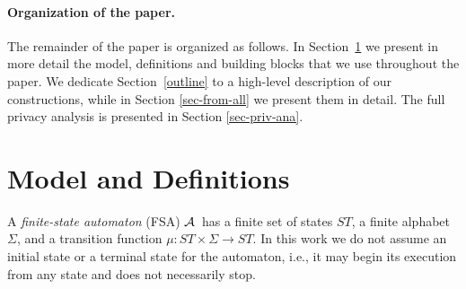 \documentclass[letterpaper,11pt]{article}
\newcommand{\ignore}[1]{}
               {}
\newcommand{\A}{$\cal A$}
\begin{document}
\vspace{-.1in}

\paragraph{Organization of the paper.} The remainder of the paper is
organized as follows. In Section~\ref{sec-Prelim_and_outline} we present
in more detail the model, definitions and building blocks that we use 
throughout the paper. We dedicate Section~\ref{outline} to a high-level
description of our constructions, while in Section \ref{sec-from-all} we 
present them in detail. The full privacy analysis is presented in Section \ref{sec-priv-ana}. 
\ignore{The first scheme $\Pi_1$, in which we need all of the agents to reconstruct the current state of the computation is described in section~\ref{sec-from-all-details}. In section \ref{sec-from-t} we present two schemes $\Pi_2$ and $\Pi_3$, in which we need only a subset of the agents to reconstruct the current state of the computation. Sections \ref{sec-from-all-details} and \ref{sec-from-t} contain proofs of correctness and security.
} 

 
\section{Model and Definitions}
\label{sec-Prelim_and_outline}


A {\it finite-state automaton} (FSA) \A\ has a finite set of states
$ST$, a finite alphabet $\Sigma$, and a transition
function $\mu: ST \times \Sigma \longrightarrow ST$. In this work we
do not assume an initial state or a terminal state for the automaton,
i.e., it may begin its execution from any state and does not
necessarily stop.
\end{document}
